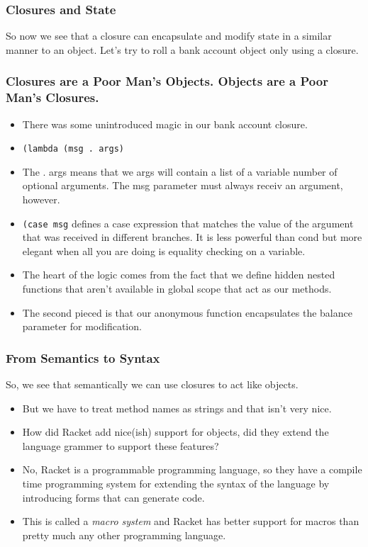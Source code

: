 \documentclass{beamer}
\begin{document}
\begin{frame}
  \frametitle{Closures and State}
  \huge So now we see that a closure can encapsulate and modify state
  in a similar manner to an object. Let's try to roll a bank account
  object only using a closure. 
\end{frame}

\begin{frame}
  \bankAccountClosure
\end{frame}

\begin{frame}
  \frametitle{Closures are a Poor Man's Objects. Objects are a Poor Man's Closures.}
  \begin{itemize}
  \item<2-> There was some unintroduced magic in our bank account closure.
  \item<3-> \texttt{(lambda (msg . args)}
  \item<4-> The . args means that we args will contain a list of a variable
    number of optional arguments. The msg parameter must always  receiv
    an argument, however.
  \item<5-> \texttt{(case msg} defines a case expression that
    matches the value of the argument that was received in different branches.
    It is less powerful than cond but more elegant when all you are doing
    is equality checking on a variable.
  \item<6-> The heart of the logic comes from the fact that we define hidden
    nested functions that aren't available in global scope that act as our
    methods.
  \item<7-> The second pieced is that our anonymous function encapsulates
    the balance parameter for modification.
  \end{itemize}
\end{frame}

\begin{frame}
  \frametitle{From Semantics to Syntax}
  So, we see that semantically we can use closures to act like objects.
  \begin{itemize}
  \item<2-> But we have to treat method names as strings and that isn't
    very nice.
  \item<3-> How did Racket add nice(ish) support for objects, did they extend
    the language grammer to support these features?
  \item<4-> No, Racket is a programmable programming language, so they have a
    compile time programming system for extending the syntax of the language
    by introducing forms that can generate code.
  \item<5-> This is called a \emph{macro system} and Racket has better support
    for macros than pretty much any other programming language.
  \end{itemize}
\end{frame}
\end{document}
